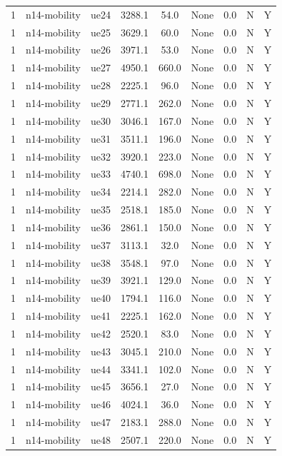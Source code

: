 \begin{table}[ht]
\begin{tabular}{|c|c|c|c|c|c|c|c|c|}
1 & n14-mobility & ue24 & 3288.1 & 54.0 & None & 0.0 & N & Y \\
1 & n14-mobility & ue25 & 3629.1 & 60.0 & None & 0.0 & N & Y \\
1 & n14-mobility & ue26 & 3971.1 & 53.0 & None & 0.0 & N & Y \\
1 & n14-mobility & ue27 & 4950.1 & 660.0 & None & 0.0 & N & Y \\
1 & n14-mobility & ue28 & 2225.1 & 96.0 & None & 0.0 & N & Y \\
1 & n14-mobility & ue29 & 2771.1 & 262.0 & None & 0.0 & N & Y \\
1 & n14-mobility & ue30 & 3046.1 & 167.0 & None & 0.0 & N & Y \\
1 & n14-mobility & ue31 & 3511.1 & 196.0 & None & 0.0 & N & Y \\
1 & n14-mobility & ue32 & 3920.1 & 223.0 & None & 0.0 & N & Y \\
1 & n14-mobility & ue33 & 4740.1 & 698.0 & None & 0.0 & N & Y \\
1 & n14-mobility & ue34 & 2214.1 & 282.0 & None & 0.0 & N & Y \\
1 & n14-mobility & ue35 & 2518.1 & 185.0 & None & 0.0 & N & Y \\
1 & n14-mobility & ue36 & 2861.1 & 150.0 & None & 0.0 & N & Y \\
1 & n14-mobility & ue37 & 3113.1 & 32.0 & None & 0.0 & N & Y \\
1 & n14-mobility & ue38 & 3548.1 & 97.0 & None & 0.0 & N & Y \\
1 & n14-mobility & ue39 & 3921.1 & 129.0 & None & 0.0 & N & Y \\
1 & n14-mobility & ue40 & 1794.1 & 116.0 & None & 0.0 & N & Y \\
1 & n14-mobility & ue41 & 2225.1 & 162.0 & None & 0.0 & N & Y \\
1 & n14-mobility & ue42 & 2520.1 & 83.0 & None & 0.0 & N & Y \\
1 & n14-mobility & ue43 & 3045.1 & 210.0 & None & 0.0 & N & Y \\
1 & n14-mobility & ue44 & 3341.1 & 102.0 & None & 0.0 & N & Y \\
1 & n14-mobility & ue45 & 3656.1 & 27.0 & None & 0.0 & N & Y \\
1 & n14-mobility & ue46 & 4024.1 & 36.0 & None & 0.0 & N & Y \\
1 & n14-mobility & ue47 & 2183.1 & 288.0 & None & 0.0 & N & Y \\
1 & n14-mobility & ue48 & 2507.1 & 220.0 & None & 0.0 & N & Y \\

\end{tabular}
\end{table}
